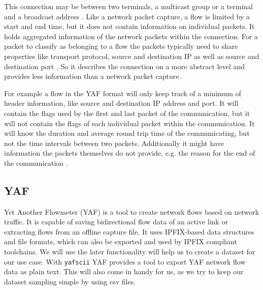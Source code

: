 \documentclass[
	ngerman,
	ruledheaders=section,%
	class=report,%
	thesis={type=bachelor},%
	accentcolor=9c,%
	custommargins=true,%
	marginpar=false,%
	parskip=half-,%
	fontsize=11pt,%
	twoside
]{tudapub}
\let\code\texttt
\begin{document}
This connection may be between two terminals, a multicast group or a terminal and a broadcast address \cite{rajahalmeIPv6FlowLabel}.
Like a network packet capture, a flow is limited by a start and end time,
but it does not contain information on individual packets.
It holds aggregated information of the network packets within the connection.
For a packet to classify as belonging to a flow the packets typically need to share properties like transport protocol, source and destination IP as well as source and destination port \cite{FlowbasedNetworkTraffic} \cite{claiseSpecificationIPFlow}.
So it describes the connection on a more abstract level and provides less information than a network packet capture.

For example a flow in the YAF format will only keep track of a minimum of header information, like source and destination IP address and port.
It will contain the flags used by the first and last packet of the communication,
but it will not contain the flags of each individual packet within the communication.
It will know the duration and average round trip time of the communicating, but not the time intervals between two packets.
Additionally it might have information the packets themselves do not provide, e.g. the reason for the end of the communication \cite{YAFDocumentation}.


\subsection{YAF}
\label{sec:yaf}

Yet Another Flowmeter (YAF) is a tool to create network flows based on network traffic.
It is capable of saving bidirectional flow data of an active link or extracting flows from an offline capture file.
It uses IPFIX-based data structures and file formats, which can also be exported and used by IPFIX compliant toolchains.
We will use the later functionality will help us to create a dataset for our use case.
With \code{yafscii} YAF provides a tool to export YAF network flow data as plain text.
This will also come in handy for us, as we try to keep our dataset sampling simple by using csv files.
\end{document}
